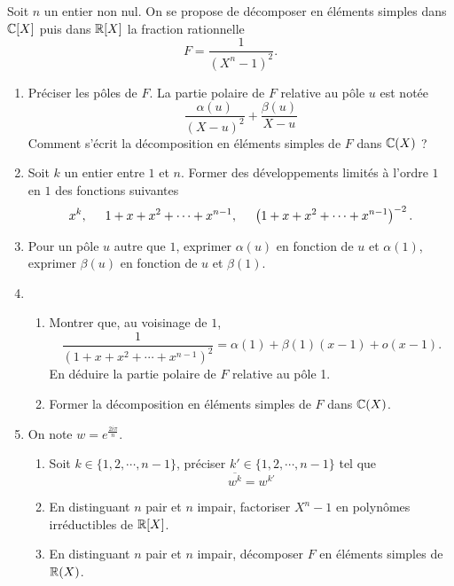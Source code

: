 Soit $n$ un entier non nul. On se propose de d{\'e}composer en {\'e}l{\'e}ments simples dans $\mathbb{C}[X]$ puis dans $\mathbb{R}[X]$ la fraction rationnelle
\begin{displaymath}
F=\frac{1}{(X^n-1)^2}. 
\end{displaymath}
\begin{enumerate}

\item Pr{\'e}ciser les p{\^o}les de $F$. La partie polaire de $F$ relative au p{\^o}le $u$ est not{\'e}e
\begin{displaymath}
 \frac{\alpha(u)}{(X-u)^2}+\frac{\beta(u)}{X-u}
\end{displaymath}
Comment s'écrit la décomposition en éléments simples de $F$ dans $\mathbb{C}(X)$ ?
\item Soit  $k$ un entier entre $1$ et $n$. Former des développements limités à l'ordre $1$ en $1$ des fonctions suivantes
\begin{displaymath}
 x^k, \hspace{0.5cm} 1+x+x^2+\cdots+x^{n-1}, \hspace{0.5cm} \left( 1+x+x^2+\cdots+x^{n-1}\right)^{-2} .
\end{displaymath}

\item Pour un pôle $u$ autre que $1$, exprimer $\alpha(u)$ en fonction de $u$ et $\alpha(1)$, exprimer $\beta(u)$ en fonction de $u$ et $\beta(1)$.

\item
\begin{enumerate}
  \item Montrer que, au voisinage de $1$,
\begin{displaymath}
 \frac{1}{(1+x+x^2+\cdots+x^{n-1})^{2}} = \alpha(1) + \beta(1)(x-1) + o(x-1).
\end{displaymath}
En d{\'e}duire la partie polaire de $F$ relative au p{\^o}le 1.
  \item Former la décomposition en éléments simples de $F$ dans $\mathbb{C}(X)$.
\end{enumerate}

\item  On note $w=e^{\frac{2i\pi}{n}}$.
 \begin{enumerate}
  \item Soit $k\in\{1,2,\cdots,n-1\}$, pr{\'e}ciser $k'\in\{1,2,\cdots,n-1\}$ tel que
\begin{displaymath}
\overline{w^k}=w^{k'} 
\end{displaymath}
 \item En distinguant $n$ pair et $n$ impair, factoriser $X^n-1$ en polyn{\^o}mes irr{\'e}ductibles de $\mathbb{R}[X]$.
 \item En distinguant $n$ pair et $n$ impair, d{\'e}composer $F$ en {\'e}l{\'e}ments simples de $\mathbb{R}(X)$.
\end{enumerate}

\end{enumerate}
